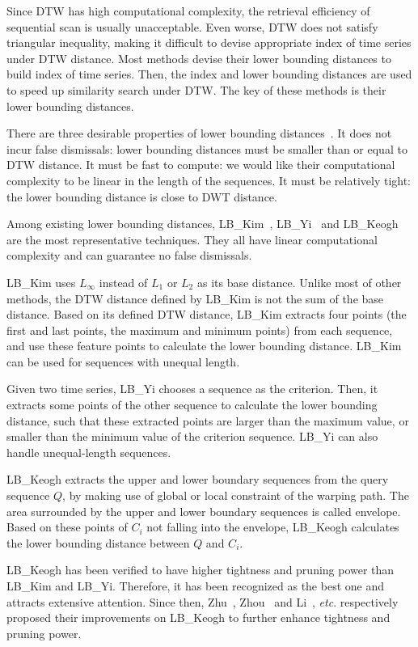 \documentclass[10pt,journal,compsoc]{IEEEtran}
\begin{document}
Since DTW has high computational complexity,
the retrieval efficiency of sequential scan is usually unacceptable.
Even worse, DTW does not satisfy triangular inequality,
making it difficult to devise appropriate index of time series under DTW distance.
Most methods devise their lower bounding distances to build index of time series.
Then, the index and lower bounding distances are used to speed up similarity search under DTW.
The key of these methods is their lower bounding distances.

There are three desirable properties of lower bounding distances~\cite{Nguyen2012Comparing}.
It does not incur false dismissals: lower bounding distances must be smaller than or equal to DTW distance.
It must be fast to compute: we would like their computational complexity to be linear in the length of the sequences.
It must be relatively tight: the lower bounding distance is close to DWT distance.

Among existing lower bounding distances, LB\_Kim~\cite{Kim2001An}, LB\_Yi~\cite{yi1998efficient}
and LB\_Keogh~\cite{keogh2005exact} are the most representative techniques.
They all have linear computational complexity and can guarantee no false dismissals.

LB\_Kim uses $L_\infty$ instead of $L_1$ or $L_2$ as its base distance.
Unlike most of other methods, the DTW distance defined by LB\_Kim is not the sum of the base distance.
Based on its defined DTW distance, LB\_Kim extracts four points (the first and last points, the maximum and minimum points) from each sequence,
and use these feature points to calculate the lower bounding distance.
LB\_Kim can be used for sequences with unequal length.

Given two time series, LB\_Yi chooses a sequence as the criterion.
Then, it extracts some points of the other sequence to calculate the lower bounding distance,
such that these extracted points are larger than the maximum value, or smaller than the minimum value of the criterion sequence.
LB\_Yi can also handle unequal-length sequences.

LB\_Keogh extracts the upper and lower boundary sequences from the query sequence $Q$,
by making use of global or local constraint of the warping path.
The area surrounded by the upper and lower boundary sequences is called envelope.
Based on these points of $C_i$ not falling into the envelope,
LB\_Keogh calculates the lower bounding distance between $Q$ and $C_i$.

LB\_Keogh has been verified to have higher tightness and pruning power than LB\_Kim and LB\_Yi.
Therefore, it has been recognized as the best one and attracts extensive attention.
Since then, Zhu~\cite{zhu2003warping}, Zhou~\cite{zhou2011boundary} and Li~\cite{Li2014Extensions}, \emph{etc}.
respectively proposed their improvements on LB\_Keogh to further enhance tightness and pruning power.
\end{document}
